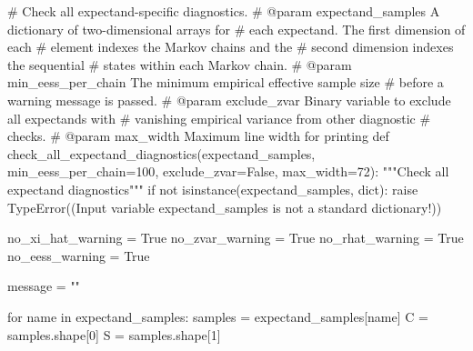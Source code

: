\documentclass[
  letterpaper,
  DIV=11,
  numbers=noendperiod]{scrartcl}
\newenvironment{Shaded}{\begin{snugshade}}{\end{snugshade}}
\newcommand{\BuiltInTok}[1]{\textcolor[rgb]{0.00,0.23,0.31}{#1}}
\newcommand{\CommentTok}[1]{\textcolor[rgb]{0.37,0.37,0.37}{#1}}
\newcommand{\ControlFlowTok}[1]{\textcolor[rgb]{0.00,0.23,0.31}{#1}}
\newcommand{\DecValTok}[1]{\textcolor[rgb]{0.68,0.00,0.00}{#1}}
\newcommand{\KeywordTok}[1]{\textcolor[rgb]{0.00,0.23,0.31}{#1}}
\newcommand{\NormalTok}[1]{\textcolor[rgb]{0.00,0.23,0.31}{#1}}
\newcommand{\OperatorTok}[1]{\textcolor[rgb]{0.37,0.37,0.37}{#1}}
\newcommand{\PreprocessorTok}[1]{\textcolor[rgb]{0.68,0.00,0.00}{#1}}
\newcommand{\StringTok}[1]{\textcolor[rgb]{0.13,0.47,0.30}{#1}}
\newcommand{\VariableTok}[1]{\textcolor[rgb]{0.07,0.07,0.07}{#1}}
\begin{document}
\begin{Shaded}
\begin{Highlighting}[]
\CommentTok{\# Check all expectand{-}specific diagnostics.}
\CommentTok{\# @param expectand\_samples A dictionary of two{-}dimensional arrays for}
\CommentTok{\#                          each expectand.  The first dimension of each}
\CommentTok{\#                          element indexes the Markov chains and the}
\CommentTok{\#                          second dimension indexes the sequential}
\CommentTok{\#                          states within each Markov chain.}
\CommentTok{\# @param min\_eess\_per\_chain The minimum empirical effective sample size}
\CommentTok{\#                           before a warning message is passed.}
\CommentTok{\# @param exclude\_zvar Binary variable to exclude all expectands with}
\CommentTok{\#                     vanishing empirical variance from other diagnostic}
\CommentTok{\#                     checks.}
\CommentTok{\# @param max\_width Maximum line width for printing}
\KeywordTok{def}\NormalTok{ check\_all\_expectand\_diagnostics(expectand\_samples,}
\NormalTok{                                    min\_eess\_per\_chain}\OperatorTok{=}\DecValTok{100}\NormalTok{,}
\NormalTok{                                    exclude\_zvar}\OperatorTok{=}\VariableTok{False}\NormalTok{,}
\NormalTok{                                    max\_width}\OperatorTok{=}\DecValTok{72}\NormalTok{):}
  \CommentTok{"""Check all expectand diagnostics"""}
  \ControlFlowTok{if} \KeywordTok{not} \BuiltInTok{isinstance}\NormalTok{(expectand\_samples, }\BuiltInTok{dict}\NormalTok{):}
    \ControlFlowTok{raise} \PreprocessorTok{TypeError}\NormalTok{((}\StringTok{\textquotesingle{}Input variable \textasciigrave{}expectand\_samples\textasciigrave{} \textquotesingle{}}
           \StringTok{\textquotesingle{}is not a standard dictionary!\textquotesingle{}}\NormalTok{))}
  
\NormalTok{  no\_xi\_hat\_warning }\OperatorTok{=} \VariableTok{True} 
\NormalTok{  no\_zvar\_warning }\OperatorTok{=} \VariableTok{True}
\NormalTok{  no\_rhat\_warning }\OperatorTok{=} \VariableTok{True}
\NormalTok{  no\_eess\_warning }\OperatorTok{=} \VariableTok{True}
  
\NormalTok{  message }\OperatorTok{=} \StringTok{""}
  
  \ControlFlowTok{for}\NormalTok{ name }\KeywordTok{in}\NormalTok{ expectand\_samples:}
\NormalTok{    samples }\OperatorTok{=}\NormalTok{ expectand\_samples[name]}
\NormalTok{    C }\OperatorTok{=}\NormalTok{ samples.shape[}\DecValTok{0}\NormalTok{]}
\NormalTok{    S }\OperatorTok{=}\NormalTok{ samples.shape[}\DecValTok{1}\NormalTok{]}
    

\end{Highlighting}
\end{Shaded}
\end{document}
